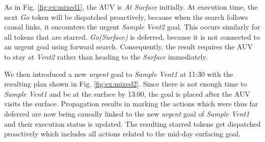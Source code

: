 
As in Fig. \ref{fig:ex:mixed1}, the AUV is {\em At Surface} initially.
At execution time, the next {\em Go} token will be dispatched
proactively, because when the search follows causal links, it
encounters the urgent {\em Sample Vent2} goal.  This occurs similarly
for all tokens that are starred. {\em Go(Surface)} is deferred,
because it is not connected to an urgent goal using forward
search. Consequently, the result requires the AUV to stay at {\em
  Vent2} rather than heading to the {\em Surface} immediately.


We then introduced a new {\em urgent} goal to {\em Sample Vent1} at
11:30 with the resulting plan shown in Fig. \ref{fig:ex:mixed2}. Since
there is not enough time to {\em Sample Vent1} and be at the surface
by 13:00, the goal is placed after the AUV visits the
surface. Propagation results in marking the actions which were thus
far deferred are now being causally linked to the new {\em urgent}
goal of {\em Sample Vent1} and their execution status is updated. The
resulting starred tokens get dispatched proactively which includes all
actions related to the mid-day surfacing goal.

